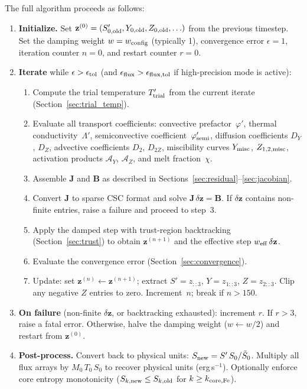 \documentclass{aastex631}
\newcommand{\Yeq}{Y_{\rm misc}}
\begin{document}
The full algorithm proceeds as follows:
\begin{enumerate}
  \item \textbf{Initialize.}
    Set $\mathbf{z}^{(0)} = (S'_{0,\rm old}, Y_{0,\rm old},
    Z_{0,\rm old}, \ldots)$ from the previous timestep.
    Set the damping weight $w = w_{\rm config}$ (typically 1),
    convergence error $\epsilon=1$, iteration counter $n=0$,
    and restart counter $r=0$.

  \item \textbf{Iterate} while
    $\epsilon > \epsilon_{\rm tol}$ (and
    $\epsilon_{\rm flux} > \epsilon_{\rm flux,tol}$ if
    high-precision mode is active):
    \begin{enumerate}
      \item[(a)] Compute the trial temperature
        $T'_{\rm trial}$ from the current iterate
        (Section~\ref{sec:trial_temp}).
      \item[(b)] Evaluate all transport coefficients:
        convective prefactor~$\varphi'$,
        thermal conductivity~$\Lambda'$,
        semiconvective coefficient~$\varphi'_{\rm semi}$,
        diffusion coefficients $D_Y$, $D_Z$,
        advective coefficients $D_2$, $D_{2Z}$,
        miscibility curves $\Yeq$, $Z_{1,2,\rm misc}$,
        activation products $\mathcal{A}_Y$, $\mathcal{A}_Z$,
        and melt fraction~$\chi$.
      \item[(c)] Assemble $\mathbf{J}$ and $\mathbf{B}$ as described in
        Sections~\ref{sec:residual}--\ref{sec:jacobian}.
      \item[(d)] Convert $\mathbf{J}$ to sparse CSC format and solve
        $\mathbf{J}\,\delta\mathbf{z} = \mathbf{B}$.
        If $\delta\mathbf{z}$ contains non-finite entries, raise a
        failure and proceed to step~3.
      \item[(e)] Apply the damped step with trust-region backtracking
        (Section~\ref{sec:trust}) to obtain $\mathbf{z}^{(n+1)}$
        and the effective step $w_{\rm eff}\,\delta\mathbf{z}$.
      \item[(f)] Evaluate the convergence error
        (Section~\ref{sec:convergence}).
      \item[(g)] Update: set $\mathbf{z}^{(n)} \leftarrow \mathbf{z}^{(n+1)}$;
        extract $S' = z_{::3}$, $Y = z_{1::3}$, $Z = z_{2::3}$.
        Clip any negative $Z$ entries to zero.
        Increment~$n$; break if $n > 150$.
    \end{enumerate}

  \item \textbf{On failure} (non-finite $\delta\mathbf{z}$, or
    backtracking exhausted):
    increment $r$.  If $r > 3$, raise a fatal error.
    Otherwise, halve the damping weight ($w \leftarrow w/2$) and
    restart from $\mathbf{z}^{(0)}$.

  \item \textbf{Post-process.}
    Convert back to physical units:
    $S_{\rm new} = S'\,S_0/\tilde{S}_0$.
    Multiply all flux arrays by $M_0\,T_0\,S_0$ to recover
    physical units (erg\,s$^{-1}$).
    Optionally enforce core entropy monotonicity
    ($S_{k,\rm new} \le S_{k,\rm old}$ for $k \ge k_{\rm core,Fe}$).
\end{enumerate}
\end{document}
